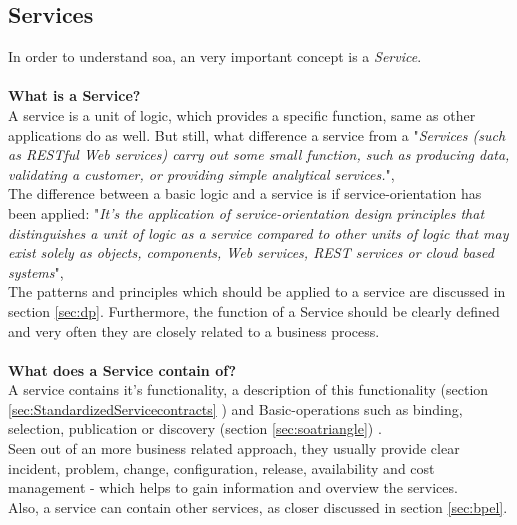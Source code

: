 \documentclass[12pt]{article}
\begin{document}
\subsection{Services} \label{sec:service}
In order to understand \gls{soa}, an very important concept is a \textit{Service}. \\
\\
\textbf{What is a Service?}\\
A service is a unit of logic, which provides a specific function, same as other applications do as well. But still, what difference a service from a 
"\textit{Services (such as RESTful Web services) carry out some small function, such as producing data, validating a customer, or providing simple analytical services.}",\cite{searchsoa} \\ The difference between a basic logic and a service is if service-orientation has been applied:
"\textit{It's the application of service-orientation design principles that distinguishes a unit of logic as a service compared to other units of logic that may exist solely as objects, components, Web services, REST services or cloud based systems}",\cite[page 29]{grau}\\ The patterns and principles which should be applied to a service are discussed in section \ref{sec:dp}. Furthermore, the function of a Service should be clearly defined and very often they are closely related to a business process.  \\\\
\textbf{What does a Service contain of?}\\
A service contains it's functionality, a description of this functionality (section \ref{sec:StandardizedServicecontracts} ) and Basic-operations such as binding, selection, publication or discovery (section \ref{sec:soatriangle}) \cite[page 8]{soagoesreal}. \\
Seen out of an more business related approach, they usually provide clear incident, problem, change, configuration, release, availability and cost management - which helps to gain information and overview the services.\\
Also, a service can contain other services, as closer discussed in section \ref{sec:bpel}.
\end{document}
